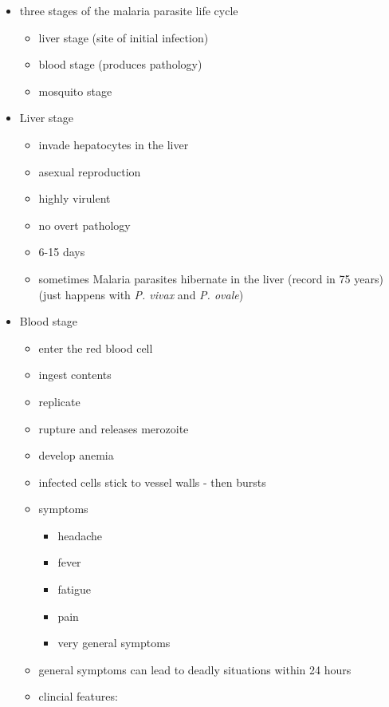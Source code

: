 \documentclass{article}
\begin{document}
\begin{itemize}
        \item three stages of the malaria parasite life cycle
        \begin{itemize}
            \item liver stage (site of initial infection)
            \item blood stage (produces pathology)
            \item mosquito stage
        \end{itemize}
        \item Liver stage
        \begin{itemize}
            \item invade hepatocytes in the liver
            \item asexual reproduction
            \item highly virulent
            \item no overt pathology
            \item 6-15 days
            \item sometimes Malaria parasites hibernate in the liver (record in 75 years) (just happens with \emph{P. vivax} and \emph{P. ovale})
        \end{itemize}
        \item Blood stage
        \begin{itemize}
            \item enter the red blood cell
            \item ingest contents
            \item replicate
            \item rupture and releases merozoite
            \item develop anemia
            \item infected cells stick to vessel walls - then bursts
            \item symptoms
            \begin{itemize}
                \item headache
                \item fever
                \item fatigue
                \item pain
                \item very general symptoms
            \end{itemize}
            \item general symptoms can lead to deadly situations within 24 hours
            \item clincial features:

\end{itemize}
\end{itemize}
\end{document}
